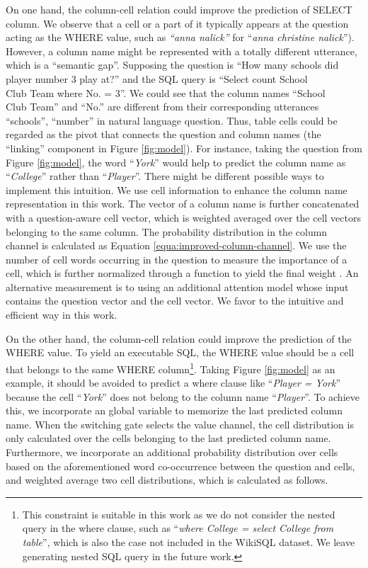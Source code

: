 \documentclass[11pt,a4paper]{article}
\begin{document}
On one hand, the column-cell relation could improve the prediction of SELECT column.
We observe that a cell or a part of it typically appears at the question acting as the WHERE value, such as \textit{``anna nalick''} for ``\textit{anna christine nalick}'').
However, a column name might be represented with a totally different utterance, which is a ``semantic gap''.
Supposing the question is ``How many schools did player number 3 play at?'' and the SQL query is ``Select count School\\Club Team where No. = 3''. We could see that the column names ``School\\Club Team'' and ``No.'' are different from their corresponding utterances ``schools'', ``number'' in natural language question. 
Thus, table cells could be regarded as the pivot that connects the question and column names (the ``linking'' component in Figure \ref{fig:model}).
For instance, taking the question from Figure \ref{fig:model},
the word ``\textit{York}'' would help to predict the column name as ``\textit{College}'' rather than ``\textit{Player}''.
There might be different possible ways to implement this intuition.
We use cell information to enhance the \mbox{column} name representation in this work.
The vector of a column name is further concatenated with a question-aware cell vector, which is weighted averaged over
the cell vectors belonging to the same column. The probability distribution in the column channel is calculated as Equation \ref{equa:improved-column-channel}.
We use the number of cell words occurring in the question to measure
the importance of a cell, which is further normalized through a  function to yield the final weight . An alternative measurement is to using an additional attention model whose input contains the question vector and the cell vector. We favor to the intuitive and efficient way in this work.




On the other hand, the column-cell relation could improve the prediction of the WHERE value.
To yield an executable SQL, the WHERE value should be a cell that belongs to the same WHERE column\footnote{This constraint is suitable in this work as we do not consider the nested query in the where clause, such as ``\textit{where College = select College from table}'', which is also the case not included in the WikiSQL dataset. We leave generating nested SQL query in the future work.}.
Taking Figure \ref{fig:model} as an example, it should be avoided to predict a where clause like ``\textit{Player = York}'' because the cell ``\textit{York}'' does not belong to the column name ``\textit{Player}''.
To achieve this, we incorporate an global variable to memorize the last predicted column name. When the switching gate selects the value channel, the \mbox{cell} distribution is only calculated over the cells belonging to the last predicted column name.
Furthermore, we incorporate an additional probability distribution over cells based on the aforementioned word co-occurrence between the question and cells, and weighted average two cell distributions, which is calculated as follows.
\end{document}
